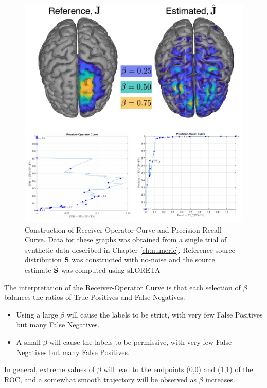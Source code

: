 \begin{figure}
\centering
\includegraphics[width=\linewidth]{./img_dev/AUROC_sketch.pdf}
%
\caption{Construction of Receiver-Operator Curve and Precision-Recall Curve.
%
Data for these graphs was obtained from a single trial of synthetic data described in Chapter \ref{ch:numeric}. Reference source distribution $\mathbf{S}$ was constructed with no-noise and the source estimate $\hat{\mathbf{S}}$ was computed using sLORETA
}
\end{figure}

The interpretation of the Receiver-Operator Curve is that each selection of $\beta$ balances the ratios of True Positives and False Negatives:
\begin{itemize}
\item 
Using a large $\beta$ will cause the labels to be strict, with very few False Positives but many False Negatives.
\item
A small $\beta$ will cause the labels to be permissive, with very few False Negatives but many False Positives.
\end{itemize}
In general, extreme values of $\beta$ will lead to the endpoints (0,0) and (1,1) of the ROC, and a somewhat smooth trajectory will be observed as $\beta$ increases.

